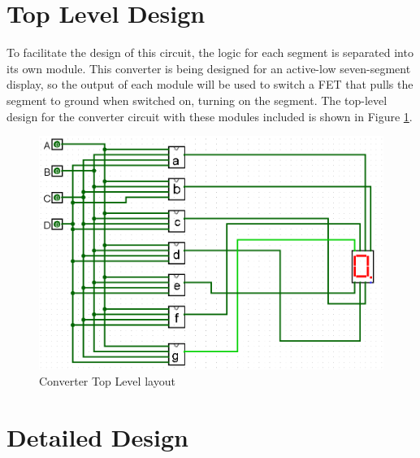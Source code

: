 \documentclass[12pt]{article}
\begin{document}
\section{Top Level Design}
To facilitate the design of this circuit, the logic for each segment is separated into its own module.
This converter is being designed for an active-low seven-segment display, so the output of each module will be used to switch a FET that pulls the segment to ground when switched on, turning on the segment.
The top-level design for the converter circuit with these modules included is shown in Figure \ref{fig:TopLevelCkt}.


\begin{figure}[H]
	\centering
	\includegraphics[width=\linewidth, keepaspectratio]{topLevelLogicCkt.png}
	\caption{Converter Top Level layout}
	\label{fig:TopLevelCkt}
\end{figure}



\section{Detailed Design}
\end{document}
